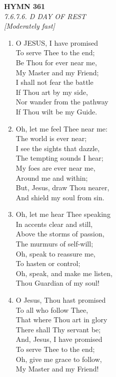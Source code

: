 \documentclass[11pt,a4paper]{article}
\begin{document}
\newpage
\begin{center}
    {\Large \textbf{HYMN 361}}
    \\
    \textit{7.6.7.6. D DAY OF REST}
    \\
    \textit{\small [Moderately fast]}
\end{center}
\vspace{1em}

\begin{enumerate}
    \item O JESUS, I have promised \\
        To serve Thee to the end; \\
        Be Thou for ever near me, \\
        My Master and my Friend; \\
        I shall not fear the battle \\
        If Thou art by my side, \\
        Nor wander from the pathway \\
        If Thou wilt be my Guide.

    \item Oh, let me feel Thee near me: \\
        The world is ever near; \\
        I see the sights that dazzle, \\
        The tempting sounds I hear; \\
        My foes are ever near me, \\
        Around me and within; \\
        But, Jesus, draw Thou nearer, \\
        And shield my soul from sin.

    \item Oh, let me hear Thee speaking \\
        In accents clear and still, \\
        Above the storms of passion, \\
        The murmurs of self-will; \\
        Oh, speak to reassure me, \\
        To hasten or control; \\
        Oh, speak, and make me listen, \\
        Thou Guardian of my soul!

    \item O Jesus, Thou hast promised \\
        To all who follow Thee, \\
        That where Thou art in glory \\
        There shall Thy servant be; \\
        And, Jesus, I have promised \\
        To serve Thee to the end; \\
        Oh, give me grace to follow, \\
        My Master and my Friend!


\end{enumerate}
\end{document}
